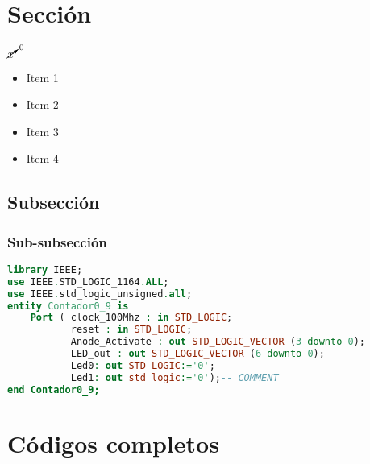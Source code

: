 \documentclass[12pt]{article}  %
\begin{document}
\section{Sección}
\cite{gh1562} %

$\cancelto{0}{x}$ %
\begin{itemize}
    \item Item 1
    \item Item 2
    \item Item 3
    \item Item 4
\end{itemize}

\subsection{Subsección}
\cite{Agarwal2019} %
\subsubsection{Sub-subsección}


\newpage

\begin{lstlisting}[language=VHDL, caption=Código en VHDL]
  library IEEE;
use IEEE.STD_LOGIC_1164.ALL;
use IEEE.std_logic_unsigned.all;
entity Contador0_9 is
    Port ( clock_100Mhz : in STD_LOGIC;
           reset : in STD_LOGIC;
           Anode_Activate : out STD_LOGIC_VECTOR (3 downto 0);
           LED_out : out STD_LOGIC_VECTOR (6 downto 0);
           Led0: out STD_LOGIC:='0';
           Led1: out std_logic:='0');-- COMMENT
end Contador0_9;
\end{lstlisting}

\newpage %
\appendix %
\section{Códigos completos}


\clearpage %
\end{document}
